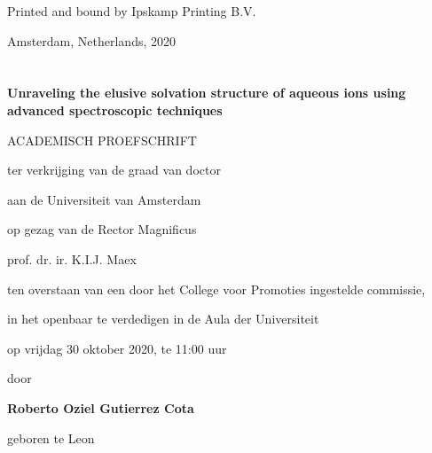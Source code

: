 \vspace{0.6cm}

\noindent Printed and bound by Ipskamp Printing B.V.

\vspace{0.6cm}

\noindent Amsterdam, Netherlands, 2020


\vspace*{\fill}



\chapter*{} %



\vspace*{\fill}
\vspace{-65pt}
\begin{center}
	{\bfseries\bigsizes\color{SchoolColor} Unraveling the elusive solvation structure of aqueous ions using advanced spectroscopic techniques} \normalsize \\
	\vspace{40pt}
	
{\Namesize ACADEMISCH PROEFSCHRIFT}

\vspace{40pt}
	
ter verkrijging van de graad van doctor

\vspace{5pt}

aan de Universiteit van Amsterdam

\vspace{5pt}
	
op gezag van de Rector Magnificus

\vspace{5pt}
	
prof. dr. ir. K.I.J. Maex

\vspace{5pt}
	
ten overstaan van een door het College voor Promoties ingestelde commissie,

\vspace{5pt}

in het openbaar te verdedigen in de Aula der Universiteit

\vspace{15pt}

op vrijdag 30 oktober 2020, te 11:00 uur

	\vspace{25pt}

door 

	\vspace{25pt}
	
	
{\bfseries\Namesize Roberto Oziel Gutierrez Cota}

	\vspace{25pt}

geboren te Leon
\end{center}
\vspace*{\fill}

